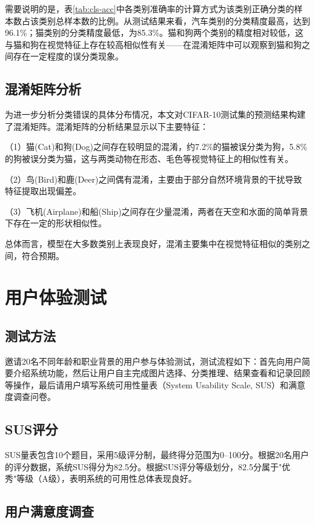 需要说明的是，表\ref{tab:cls-acc}中各类别准确率的计算方式为该类别正确分类的样本数占该类别总样本数的比例。从测试结果来看，汽车类别的分类精度最高，达到96.1\%；猫类别的分类精度最低，为85.3\%。猫和狗两个类别的精度相对较低，这与猫和狗在视觉特征上存在较高相似性有关——在混淆矩阵中可以观察到猫和狗之间存在一定程度的误分类现象。

\subsection{混淆矩阵分析}

为进一步分析分类错误的具体分布情况，本文对CIFAR-10测试集的预测结果构建了混淆矩阵。混淆矩阵的分析结果显示以下主要特征：

（1）猫(Cat)和狗(Dog)之间存在较明显的混淆，约7.2\%的猫被误分类为狗，5.8\%的狗被误分类为猫，这与两类动物在形态、毛色等视觉特征上的相似性有关。

（2）鸟(Bird)和鹿(Deer)之间偶有混淆，主要由于部分自然环境背景的干扰导致特征提取出现偏差。

（3）飞机(Airplane)和船(Ship)之间存在少量混淆，两者在天空和水面的简单背景下存在一定的形状相似性。

总体而言，模型在大多数类别上表现良好，混淆主要集中在视觉特征相似的类别之间，符合预期。

\section{用户体验测试}

\subsection{测试方法}

邀请20名不同年龄和职业背景的用户参与体验测试，测试流程如下：首先向用户简要介绍系统功能，然后让用户自主完成图片选择、分类推理、结果查看和记录回顾等操作，最后请用户填写系统可用性量表（System Usability Scale, SUS）和满意度调查问卷。

\subsection{SUS评分}

SUS量表包含10个题目，采用5级评分制，最终得分范围为0--100分。根据20名用户的评分数据，系统SUS得分为82.5分。根据SUS评分等级划分，82.5分属于"优秀"等级（A级），表明系统的可用性总体表现良好。

\subsection{用户满意度调查}


